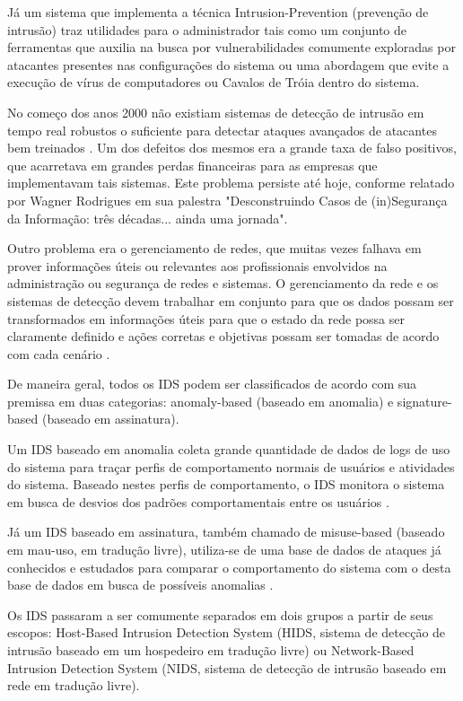 \documentclass[openright]{normas-utf-tex} %
\begin{document}
	Já um sistema que implementa a técnica Intrusion-Prevention (prevenção de intrusão) traz utilidades para o administrador tais como um conjunto de ferramentas que auxilia na busca por vulnerabilidades comumente exploradas por atacantes presentes nas configurações do sistema ou uma abordagem que evite a execução de vírus de computadores ou Cavalos de Tróia dentro do sistema.	
	
	No começo dos anos 2000 não existiam sistemas de detecção de intrusão em tempo real robustos o suficiente para detectar ataques avançados de atacantes bem treinados \cite{fusion}. Um dos defeitos dos mesmos era a grande taxa de falso positivos, que acarretava em grandes perdas financeiras para as empresas que implementavam tais sistemas. Este problema persiste até hoje, conforme relatado por Wagner Rodrigues em sua palestra "Desconstruindo Casos de (in)Segurança da Informação: três décadas... ainda uma jornada".
	
	Outro problema era o gerenciamento de redes, que muitas vezes falhava em prover informações úteis ou relevantes aos profissionais envolvidos na administração ou segurança de redes e sistemas. O gerenciamento da rede e os sistemas de detecção devem trabalhar em conjunto para que os dados possam ser transformados em informações úteis para que o estado da rede possa ser claramente definido e ações corretas e objetivas possam ser tomadas de acordo com cada cenário \cite{fusion}.
	
	De maneira geral, todos os IDS podem ser classificados de acordo com sua premissa em duas categorias: anomaly-based (baseado em anomalia) e signature-based (baseado em assinatura).
	
	Um IDS baseado em anomalia coleta grande quantidade de dados de logs de uso do sistema para traçar perfis de comportamento normais de usuários e atividades do sistema. Baseado nestes perfis de comportamento, o IDS monitora o sistema em busca de desvios dos padrões comportamentais entre os usuários \cite{bou}.
	
	Já um IDS baseado em assinatura, também chamado de misuse-based (baseado em mau-uso, em tradução livre), utiliza-se de uma base de dados de ataques já conhecidos e estudados para comparar o comportamento do sistema com o desta base de dados em busca de possíveis anomalias \cite{tree}.
	
	Os IDS passaram a ser comumente separados em dois grupos a partir de seus escopos: Host-Based Intrusion Detection System (HIDS, sistema de detecção de intrusão baseado em um hospedeiro em tradução livre) ou Network-Based Intrusion Detection System (NIDS, sistema de detecção de intrusão baseado em rede em tradução livre).
	
\end{document}
